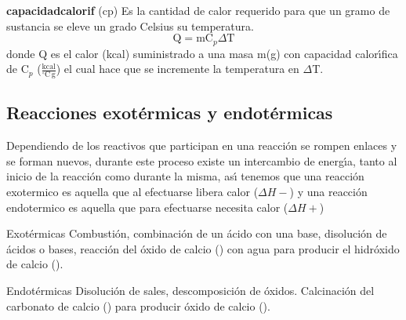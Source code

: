 \noindent\textbf{\gls{capacidadcalorif}} (\gls{cp}) Es la cantidad de calor requerido para que un gramo de sustancia se eleve  un grado Celsius su temperatura.
\begin{equation}
\textrm{Q} =\textrm{m} \textrm{C}_p \Delta \textrm{T}
\end{equation}
 donde
Q es el calor  (kcal) suministrado a una masa m(\si{\gram}) con capacidad calor\'{\i}fica de C$_p$ ($\frac{\textrm{kcal}}{^\circ \textrm{C}\,\si{\gram}}$) el cual hace que se incremente la temperatura en $\Delta$T.

\subsection{Reacciones exot\'ermicas y endot\'ermicas}

Dependiendo de los reactivos que participan en una reacci\'on se rompen enlaces y se forman nuevos, durante este proceso existe un intercambio de energ\'{\i}a, tanto al inicio de la reacci\'on como durante la misma, as\'{\i} tenemos que una reacci\'on \gls{exotermico} es aquella que al efectuarse libera calor ($\Delta H -$)
 y una reacci\'on \gls{endotermico} es aquella que para efectuarse necesita calor ($\Delta H +$) 

\begin{ejemplo}{Exot\'ermicas}
Combusti\'on, combinaci\'on de un \'acido con una base, disoluci\'on de \'acidos o bases, reacci\'on del \'oxido de calcio () con agua para producir el hidr\'oxido de calcio ().
\end{ejemplo}
\begin{ejemplo}{Endot\'ermicas}
 Disoluci\'on de sales, descomposici\'on de \'oxidos. Calcinaci\'on del carbonato de calcio () para producir \'oxido de calcio ().
\end{ejemplo}

